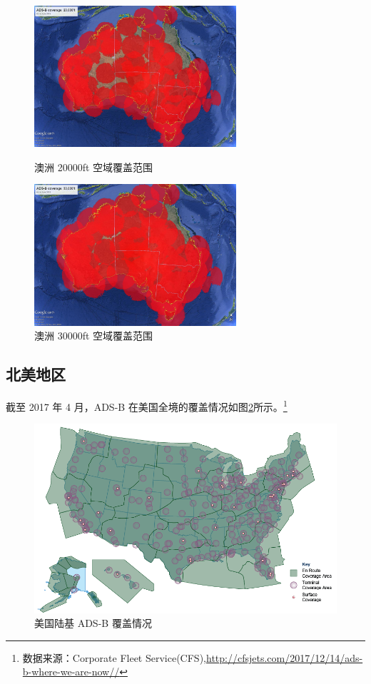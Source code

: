 \begin{figure}[htbp]
\centering
\begin{minipage}[t]{0.48\textwidth}
\centering
\includegraphics[width=7.5cm]{pic/ADS-B-20k.jpg}
\caption{澳洲 20000ft 空域覆盖范围}
\label{fig:ADS-B-20k}
\end{minipage}
\begin{minipage}[t]{0.48\textwidth}
\centering
\includegraphics[width=7.5cm]{pic/ADS-B-30k.jpg}
\caption{澳洲 30000ft 空域覆盖范围}
\label{fig:ADS-B-30k}
\end{minipage}
\end{figure}

\subsection{北美地区}

截至 2017 年 4 月，ADS-B 在美国全境的覆盖情况如图\ref{fig:ADS-B-Coverage-Area}所示。\footnote{数据来源：Corporate Fleet Service(CFS),\url{http://cfsjets.com/2017/12/14/ads-b-where-we-are-now//}}

\begin{figure}[htbp]
\centering
\includegraphics[width=14cm]{pic/ADS-B-Coverage-Area.png}
\caption{美国陆基 ADS-B 覆盖情况}
\label{fig:ADS-B-Coverage-Area}
\end{figure}


